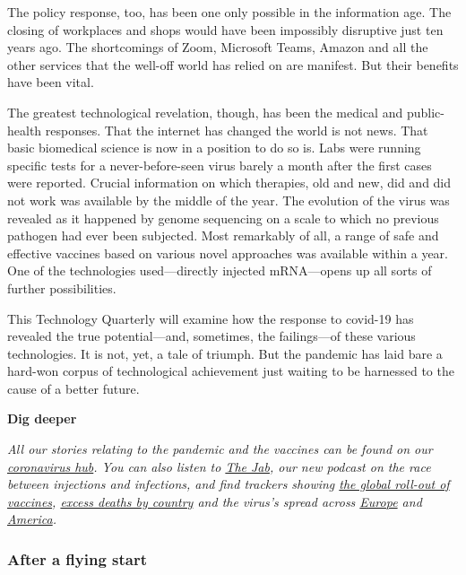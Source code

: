 \documentclass{article}
\begin{document}
The policy response, too, has been one only possible in the information age. The closing of workplaces and shops would have been impossibly disruptive just ten years ago. The shortcomings of Zoom, Microsoft Teams, Amazon and all the other services that the well-off world has relied on are manifest. But their benefits have been vital. 

The greatest technological revelation, though, has been the medical and public-health responses. That the internet has changed the world is not news. That basic biomedical science is now in a position to do so is. Labs were running specific tests for a never-before-seen virus barely a month after the first cases were reported. Crucial information on which therapies, old and new, did and did not work was available by the middle of the year. The evolution of the virus was revealed as it happened by genome sequencing on a scale to which no previous pathogen had ever been subjected. Most remarkably of all, a range of safe and effective vaccines based on various novel approaches was available within a year. One of the technologies used---directly injected mRNA---opens up all sorts of further possibilities. 

This Technology Quarterly will examine how the response to covid-19 has revealed the true potential---and, sometimes, the failings---of these various technologies. It is not, yet, a tale of triumph. But the pandemic has laid bare a hard-won corpus of technological achievement just waiting to be harnessed to the cause of a better future.{} 

\textbf{Dig deeper} 

\emph{All our stories relating to the pandemic and the vaccines can be found on our \href{/news/2020/03/11/the-economists-coverage-of-the-coronavirus}{coronavirus hub}. You can also listen to \href{/podcasts/the-jab-a-new-podcast-from-the-economist}{The Jab}, our new podcast on the race between injections and infections, and find trackers showing \href{https://www.economist.com/graphic-detail/tracking-coronavirus-across-the-world}{the global roll-out of vaccines}, \href{https://www.economist.com/graphic-detail/coronavirus-excess-deaths-tracker}{excess deaths by country} and the virus's spread across \href{https://www.economist.com/graphic-detail/tracking-coronavirus-across-europe}{Europe} and \href{https://www.economist.com/graphic-detail/tracking-coronavirus-across-america}{America}.} 
\clearpage
\subsubsection{After a flying start }
\end{document}

